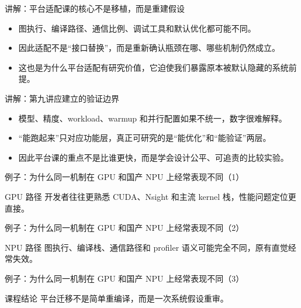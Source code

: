 \begin{frame}{讲解：平台适配课的核心不是移植，而是重建假设}
  \begin{itemize}
    \item 图执行、编译路径、通信比例、调试工具和默认优化都可能不同。
    \item 因此适配不是“接口替换”，而是重新确认瓶颈在哪、哪些机制仍然成立。
    \item 这也是为什么平台适配有研究价值，它迫使我们暴露原本被默认隐藏的系统前提。
  \end{itemize}
\end{frame}

\begin{frame}{讲解：第九讲应建立的验证边界}
  \begin{itemize}
    \item 模型、精度、workload、warmup 和并行配置如果不统一，数字很难解释。
    \item “能跑起来”只对应功能层，真正可研究的是“能优化”和“能验证”两层。
    \item 因此平台课的重点不是比谁更快，而是学会设计公平、可追责的比较实验。
  \end{itemize}
\end{frame}

\begin{frame}{例子：为什么同一机制在 GPU 和国产 NPU 上经常表现不同（1）}
\begin{block}{GPU 路径}
    开发者往往更熟悉 CUDA、Nsight 和主流 kernel 栈，性能问题定位更直接。
  \end{block}
\end{frame}

\begin{frame}{例子：为什么同一机制在 GPU 和国产 NPU 上经常表现不同（2）}
\begin{block}{NPU 路径}
    图执行、编译栈、通信路径和 profiler 语义可能完全不同，原有直觉经常失效。
  \end{block}
\end{frame}

\begin{frame}{例子：为什么同一机制在 GPU 和国产 NPU 上经常表现不同（3）}
\begin{block}{课程结论}
    平台迁移不是简单重编译，而是一次系统假设重审。
  \end{block}
\end{frame}

